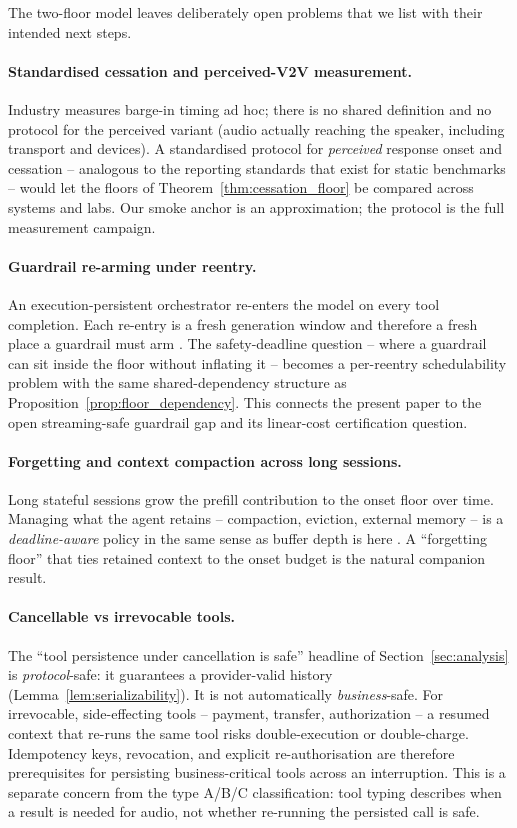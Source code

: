 The two-floor model leaves deliberately open problems that we list with their intended next
steps.

\paragraph{Standardised cessation and perceived-V2V measurement.}
Industry measures barge-in timing ad hoc; there is no shared definition and no protocol for the
perceived variant (audio actually reaching the speaker, including transport and devices).
A standardised protocol for \emph{perceived} response onset and cessation -- analogous to the
reporting standards that exist for static benchmarks -- would let the floors of
Theorem~\ref{thm:cessation_floor} be compared across systems and labs.
Our smoke anchor is an approximation; the protocol is the full measurement campaign.

\paragraph{Guardrail re-arming under reentry.}
An execution-persistent orchestrator re-enters the model on every tool completion.
Each re-entry is a fresh generation window and therefore a fresh place a guardrail must arm
\citep{dong2024building}.
The safety-deadline question -- where a guardrail can sit inside the floor without inflating it
-- becomes a per-reentry schedulability problem with the same shared-dependency structure as
Proposition~\ref{prop:floor_dependency}.
This connects the present paper to the open streaming-safe guardrail gap and its
linear-cost certification question.

\paragraph{Forgetting and context compaction across long sessions.}
Long stateful sessions grow the prefill contribution to the onset floor over time.
Managing what the agent retains -- compaction, eviction, external memory -- is a
\emph{deadline-aware} policy in the same sense as buffer depth is here
\citep{xiao2023streamingllm,packer2023memgpt}.
A ``forgetting floor'' that ties retained context to the onset budget is the natural companion
result.

\paragraph{Cancellable vs irrevo\-cable tools.}
The ``tool persistence under cancellation is safe'' headline of
Section~\ref{sec:analysis} is \emph{protocol}-safe: it guarantees a provider-valid history
(Lemma~\ref{lem:serializability}).
It is not automatically \emph{business}-safe.
For irrevocable, side-effecting tools -- payment, transfer, authorization -- a resumed context
that re-runs the same tool risks double-execution or double-charge.
Idempotency keys, revocation, and explicit re-authorisation are therefore prerequisites for
persisting business-critical tools across an interruption.
This is a separate concern from the type A/B/C classification: tool typing describes when
a result is needed for audio, not whether re-running the persisted call is safe.

